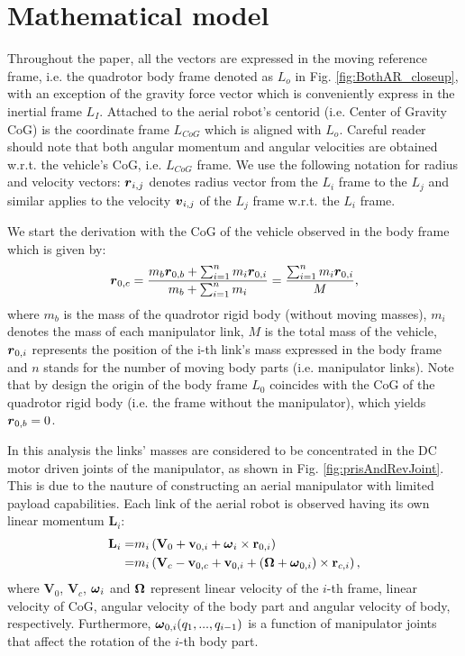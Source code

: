 \section{Mathematical model}
Throughout the paper, all the vectors are expressed in the moving reference frame, i.e. the quadrotor body frame denoted as $L_o$ in Fig. \ref{fig:BothAR_closeup}, with an exception of the gravity force vector which is conveniently express in the inertial frame $L_I$. Attached to the aerial robot's centorid (i.e. Center of Gravity CoG) is the coordinate frame $L_{CoG}$ which is aligned with $L_o$. Careful reader should note that both angular momentum and angular velocities are obtained w.r.t. the vehicle's CoG, i.e. $L_{CoG}$ frame. We use the following notation for radius and velocity vectors:  $\boldsymbol{r}_{i,j}$ denotes radius vector from the $L_i$ frame to the $L_{j}$ and similar applies to the velocity $\boldsymbol{v}_{i,j}$ of the $L_j$ frame w.r.t. the $L_{i}$ frame.


We start the derivation with the CoG of the vehicle observed in the body frame which is given by:
\begin{equation}
\boldsymbol{r}_{0,c} = \frac{m_{b}\boldsymbol{r}_{0,b} + \sum_{i=1}^n m_{i}\boldsymbol{r}_{0,i}}{m_{b} + \sum_{i=1}^n m_{i}} = \frac{\sum_{i=1}^n m_{i}\boldsymbol{r}_{0,i}}{M},
\label{equ:cog}
\end{equation}
where $m_b$ is the mass of the quadrotor rigid body (without moving masses), $m_i$ denotes the mass of each manipulator link, $M$ is the total mass of the vehicle, $\boldsymbol{r}_{0,i}$ represents the position of the i-th link's mass expressed in the body frame and $n$ stands for the number of moving body parts (i.e. manipulator links). Note that by design the origin of the body frame $L_0$ coincides with the CoG of the quadrotor rigid body (i.e. the frame without the manipulator), which yields $\boldsymbol{r}_{0,b} = 0$.

In this analysis the links' masses are considered to be concentrated in the DC motor driven joints of the manipulator, as shown in Fig. \ref{fig:prisAndRevJoint}. This is due to the nauture of constructing an aerial manipulator with limited payload capabilities. Each link of the aerial robot is observed having its own linear momentum $\textbf{L}_{i}$:
\begin{align}
\textbf{L}_{i}=& m_i \left ( \textbf{V}_0+\textbf{v}_{0,i} + \boldsymbol{\omega}_i \times \textbf{r}_{0,i}\right) \\ \nonumber
=&m_i \left ( \textbf{V}_c - \textbf{v}_{0,c}+\textbf{v}_{0,i}  + (\boldsymbol{\Omega} + \boldsymbol{\omega}_{0,i}) \times \textbf{r}_{c,i}\right),
\end{align}  
where $\textbf{V}_0$, $\textbf{V}_c$, $\boldsymbol{\omega}_i$ and $\boldsymbol{\Omega}$ represent linear velocity of the $i$-th frame, linear velocity of CoG, angular velocity of the body part and angular velocity of body, respectively. Furthermore, $\boldsymbol{\omega}_{0,i}(q_1, ..., q_{i-1})$ is a function of manipulator joints that affect the rotation of the $i$-th body part.  

